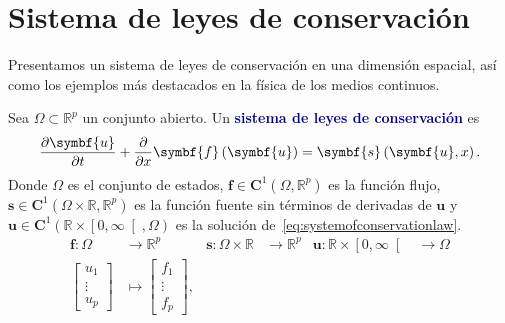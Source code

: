 \chapter{Sistema de leyes de conservación}

Presentamos un sistema de leyes de conservación en una dimensión
espacial, así como los ejemplos más destacados en la física de los
medios continuos.

\begin{definition}
	Sea $\Omega\subset\mathbb{R}^{p}$ un conjunto abierto.
	Un \textcolor{DarkBlue}{\bfseries sistema de leyes de conservación}
	 es
	\begin{equation}\label{eq:systemofconservationlaw}
		\diffp{\symbf{u}}{t}+
		\diffp{}{x}
		\symbf{f}\left(\symbf{u}\right)=
		\symbf{s}\left(\symbf{u},x\right).
	\end{equation}
	Donde $\Omega$ es el conjunto de estados,
	\begin{math}
		\symbf{f}\in\symbf{C}^{1}
		\left(\Omega,\mathbb{R}^{p}\right)
	\end{math}
	es la función flujo,
	\begin{math}
		\symbf{s}\in
		\symbf{C}^{1}
		\left(\Omega\times\mathbb{R},\mathbb{R}^{p}\right)
	\end{math}
	es la función fuente sin términos de derivadas de $\symbf{u}$ y
	\begin{math}
		\symbf{u}\in
		\symbf{C}^{1}
		\left(\mathbb{R}\times\left[0,\infty\right[,\Omega\right)
	\end{math} es la solución de~\eqref{eq:systemofconservationlaw}.
	\begin{align*}
		\symbf{f}\colon\Omega                                &
		\longrightarrow\mathbb{R}^{p}                        &
		\symbf{s}\colon\Omega\times\mathbb{R}                &
		\longrightarrow\mathbb{R}^{p}                        &
		\symbf{u}\colon\mathbb{R}\times\left[0,\infty\right[ &
		\longrightarrow\Omega                                  \\
		\begin{bmatrix}
			u_{1}  \\
			\vdots \\
			u_{p}
		\end{bmatrix}                                      &
		\longmapsto
		\begin{bmatrix}
			f_{1}  \\
			\vdots \\
			f_{p}
		\end{bmatrix},                                      &

\end{align*}
\end{definition}
